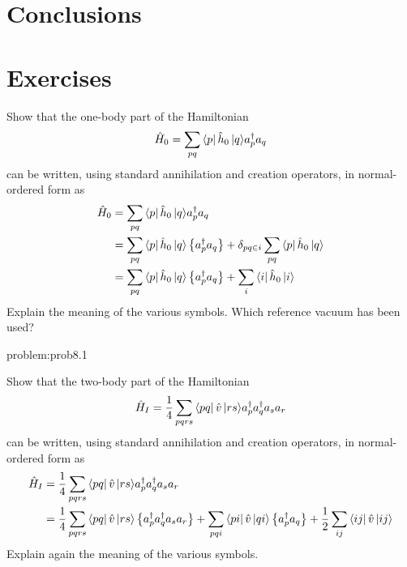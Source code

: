 \section{Conclusions}


\section{Exercises}
\begin{prob} \label{problem:prob8.1}
Show that the one-body part of the Hamiltonian
    \begin{equation*}
        \hat{H}_0 = \sum_{pq} \bra{p}\hat{h}_0\,|{q}\rangle a^\dagger_p a_q
    \end{equation*}
can be written, using standard annihilation and creation operators, in normal-ordered form as 
    \begin{align*}
        \hat{H}_0 &= \sum_{pq} \bra{p}\hat{h}_0\,|{q}\rangle a^\dagger_p a_q \nonumber \\
            &= \sum_{pq} \bra{p}\hat{h}_0\,|{q}\rangle \left\{a^\dagger_p a_q\right\} + 
                \delta_{pq\in i} \sum_{pq} \bra{p}\hat{h}_0\,|{q}\rangle \nonumber \\
            &= \sum_{pq} \bra{p}\hat{h}_0\,|{q}\rangle \left\{a^\dagger_p a_q\right\} +
                \sum_i \bra{i}\hat{h}_0\,|{i}\rangle
    \end{align*}
Explain the meaning of the various symbols. Which reference 
vacuum has been used?
\end{prob}

\begin{sol}{problem:prob8.1}

\end{sol}

\begin{prob} \label{problem:prob8.2}
Show that the two-body part of the Hamiltonian
    \begin{equation*}
        \hat{H}_I = \frac{1}{4} \sum_{pqrs} \bra{pq}\hat{v}\,|{rs}\rangle a^\dagger_p a^\dagger_q a_s  a_r
    \end{equation*}
can be written, using standard annihilation and creation operators, in normal-ordered form as 
    \begin{align*}
    \hat{H}_I &= \frac{1}{4} \sum_{pqrs} \bra{pq}\hat{v}\,|{rs}\rangle a^\dagger_p a^\dagger_q a_s  a_r \nonumber \\
        &= \frac{1}{4} \sum_{pqrs} \bra{pq}\hat{v}\,|{rs}\rangle \left\{a^\dagger_p a^\dagger_q a_s  a_r\right\}
            + \sum_{pqi} \bra{pi}\hat{v}\,|{qi}\rangle \left\{a^\dagger_p a_q\right\} 
            + \frac{1}{2} \sum_{ij} \bra{ij}\hat{v}\,|{ij}\rangle
    \end{align*}
Explain again the meaning of the various symbols.
\end{prob}

